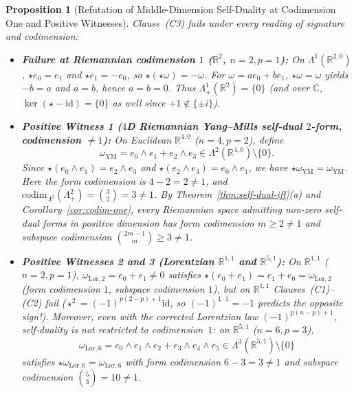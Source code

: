 \documentclass[11pt]{article}
\newtheorem{proposition}[theorem]{Proposition}
\theoremstyle{definition}
\newcommand{\R}{\mathbb{R}}
\newcommand{\C}{\mathbb{C}}
\newcommand{\codim}{\mathrm{codim}}
\newcommand{\id}{\mathrm{id}}
\begin{document}
\begin{proposition}[Refutation of Middle-Dimension Self-Duality at Codimension One and Positive Witnesses]\label{prop:refute-clause3}
Clause~(C3) fails under every reading of signature and codimension:
\begin{itemize}
  \item[(a)] \textbf{Failure at Riemannian codimension $1$ ($\R^2$, $n=2, p=1$):} On $\Lambda^1(\R^{2,0})$, $\star e_0 = e_1$ and $\star e_1 = -e_0$, so $\star(\star\omega) = -\omega$. For $\omega = a e_0 + b e_1$, $\star\omega = \omega$ yields $-b = a$ and $a = b$, hence $a = b = 0$. Thus $\Lambda^1_+(\R^2) = \{0\}$ (and over $\C$, $\ker(\star - \id) = \{0\}$ as well since $+1 \notin \{\pm i\}$).
  \item[(b)] \textbf{Positive Witness 1 ($4$D Riemannian Yang--Mills self-dual $2$-form, codimension $\neq 1$):} On Euclidean $\R^{4,0}$ ($n = 4, p = 2$), define
  \[
    \omega_{\mathrm{YM}} = e_0 \wedge e_1 + e_2 \wedge e_3 \in \Lambda^2(\R^{4,0}) \setminus \{0\}.
  \]
  Since $\star(e_0 \wedge e_1) = e_2 \wedge e_3$ and $\star(e_2 \wedge e_3) = e_0 \wedge e_1$, we have $\star\omega_{\mathrm{YM}} = \omega_{\mathrm{YM}}$. Here the form codimension is $4 - 2 = 2 \neq 1$, and $\codim_{\Lambda^2}(\Lambda^2_+) = \binom{3}{2} = 3 \neq 1$. By Theorem~\ref{thm:self-dual-iff}(a) and Corollary~\ref{cor:codim-one}, \emph{every} Riemannian space admitting non-zero self-dual forms in positive dimension has form codimension $m \ge 2 \neq 1$ and subspace codimension $\binom{2m-1}{m} \ge 3 \neq 1$.
  \item[(c)] \textbf{Positive Witnesses 2 and 3 (Lorentzian $\R^{1,1}$ and $\R^{5,1}$):} On $\R^{1,1}$ ($n=2, p=1$), $\omega_{\mathrm{Lor},2} = e_0 + e_1 \neq 0$ satisfies $\star(e_0 + e_1) = e_1 + e_0 = \omega_{\mathrm{Lor},2}$ (form codimension $1$, subspace codimension $1$), \emph{but} on $\R^{1,1}$ Clauses~(C1)--(C2) fail ($\star^2 = (-1)^{p(2-p)+1}\id$, so $(-1)^{1 \cdot 1} = -1$ predicts the opposite sign!). Moreover, even with the corrected Lorentzian law $(-1)^{p(n-p)+1}$, self-duality is \emph{not} restricted to codimension~$1$: on $\R^{5,1}$ ($n = 6, p = 3$),
  \[
    \omega_{\mathrm{Lor},6} = e_0 \wedge e_1 \wedge e_2 + e_3 \wedge e_4 \wedge e_5 \in \Lambda^3(\R^{5,1}) \setminus \{0\}
  \]
  satisfies $\star\omega_{\mathrm{Lor},6} = \omega_{\mathrm{Lor},6}$ with form codimension $6 - 3 = 3 \neq 1$ and subspace codimension $\binom{5}{3} = 10 \neq 1$.
\end{itemize}
\end{proposition}
\end{document}
